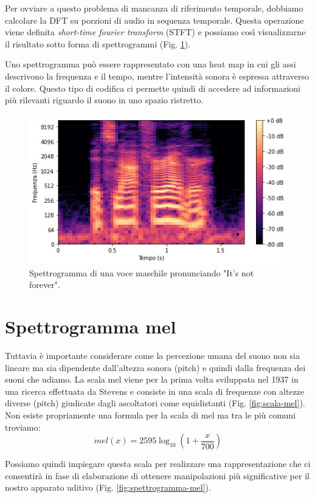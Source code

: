 		Per ovviare a questo problema di mancanza di riferimento temporale, dobbiamo calcolare la DFT su porzioni di audio in sequenza temporale. Questa operazione viene definita \textit{short-time fourier transform} (STFT) e possiamo così visualizzarne il risultato sotto forma di spettrogrammi (Fig. \ref{fig:spettrogramma})\cite{time-frequency-review}.
		
		 Uno spettrogramma può essere rappresentato con una heat map in cui gli assi descrivono la frequenza e il tempo, mentre l'intensità sonora è espressa attraverso il colore. Questo tipo di codifica ci permette quindi di accedere ad informazioni più rilevanti riguardo il suono in uno spazio ristretto.
		\begin{figure}%
			\centering
			\includegraphics[width=0.75\linewidth]{figures/spectrogram}
			\caption{Spettrogramma di una voce maschile pronunciando "It's not forever".}
			\label{fig:spettrogramma}
		\end{figure}
	
		\section{Spettrogramma mel}
		 Tuttavia è importante considerare come la percezione umana del suono non sia lineare ma sia dipendente dall'altezza sonora (pitch) e quindi dalla frequenza dei suoni che udiamo. La scala mel viene per la prima volta sviluppata nel 1937 in una ricerca effettuata da Stevens e consiste in una scala di frequenze con altezze diverse (pitch) giudicate dagli ascoltatori come equidistanti (Fig. \ref{fig:scala-mel})\cite{Stevens1937}.
		 Non esiste propriamente una formula per la scala di mel ma tra le più comuni troviamo:
		 \begin{equation}
		 	mel(x) = 2595 \log_{10}(1+\frac{x}{700})
		 \end{equation}
		 
	 	
		Possiamo quindi impiegare questa scala per realizzare una rappresentazione che ci consentirà in fase di elaborazione di ottenere manipolazioni più significative per il nostro apparato uditivo (Fig. \ref{fig:spettrogramma-mel}).
		
